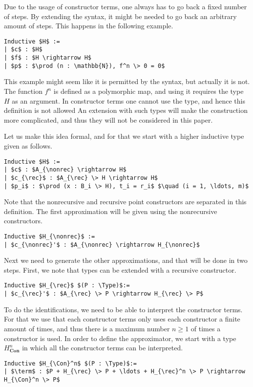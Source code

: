 \documentclass[a4paper,UKenglish]{lipics-v2016}
\newcommand{\rec}[0]{\operatorname{rec}}
\newcommand{\nonrec}[0]{\operatorname{nonrec}}
\newcommand{\term}[0]{\textbf{term}}
\newcommand{\Con}[0]{\textbf{Con}}
\newcommand{\Type}[0]{\operatorname{\textsc{Type}}}
\begin{document}
Due to the usage of constructor terms, one always has to go back a fixed number of steps.
By extending the syntax, it might be needed to go back an arbitrary amount of steps.
This happens in the following example.
\lstset{language=Coq}
\begin{lstlisting}
Inductive $H$ :=
| $c$ : $H$
| $f$ : $H \rightarrow H$
| $p$ : $\prod (n : \mathbb{N}), f^n \> 0 = 0$
\end{lstlisting}
This example might seem like it is permitted by the syntax, but actually it is not.
The function $f^n$ is defined as a polymorphic map, and using it requires the type $H$ as an argument.
In constructor terms one cannot use the type, and hence this definition is not allowed
An extension with such types will make the construction more complicated, and thus they will not be considered in this paper.

Let us make this idea formal, and for that we start with a higher inductive type given as follows.
\lstset{language=Coq}
\begin{lstlisting}[label={lst:HIT}]
Inductive $H$ :=
| $c$ : $A_{\nonrec} \rightarrow H$
| $c_{\rec}$ : $A_{\rec} \> H \rightarrow H$
| $p_i$ : $\prod (x : B_i \> H), t_i = r_i$ $\quad (i = 1, \ldots, m)$
\end{lstlisting}
Note that the nonrecursive and recursive point constructors are separated in this definition.
The first approximation will be given using the nonrecursive constructors.
\lstset{language=Coq}
\begin{lstlisting}
Inductive $H_{\nonrec}$ :=
| $c_{\nonrec}'$ : $A_{\nonrec} \rightarrow H_{\nonrec}$
\end{lstlisting}

Next we need to generate the other approximations, and that will be done in two steps.
First, we note that types can be extended with a recursive constructor.
\lstset{language=Coq}
\begin{lstlisting}
Inductive $H_{\rec}$ $(P : \Type)$:=
| $c_{\rec}'$ : $A_{\rec} \> P \rightarrow H_{\rec} \> P$
\end{lstlisting}
To do the identifications, we need to be able to interpret the constructor terms.
For that we use that each constructor terms only uses each constructor  a finite amount of times, and thus there is a maximum number $n \geq 1$ of times a constructor is used.
In order to define the approximator, we start with a type $H_{\Con}^n$ in which all the constructor terms can be interpreted.
\lstset{language=Coq}
\begin{lstlisting}
Inductive $H_{\Con}^n$ $(P : \Type)$:=
| $\term$ : $P + H_{\rec} \> P + \ldots + H_{\rec}^n \> P \rightarrow H_{\Con}^n \> P$
\end{lstlisting}
\end{document}
